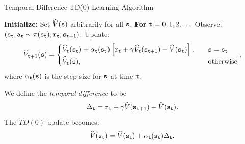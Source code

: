 





\begin{algorithm}[H]
\caption{Temporal Difference TD(0) Learning Algorithm}
\begin{algorithmic}[1]
\State \textbf{Initialize:} Set $\widehat{V}({\tt s})$ arbitrarily for all ${\tt s}$.
\State \textbf{For} {${\tt t} = 0, 1, 2, \dots$}
    \State \quad Observe: $({\tt s}_{\tt t}, {\tt a}_{\tt t} \sim \pi({\tt s}_{\tt t}), {\tt r}_{\tt t}, {\tt s}_{{\tt t}+1})$.
    \State \quad Update:
    \[
    \widehat{V}_{{\tt t}+1}({\tt s}) = \begin{cases}
        \widehat{V}_{\tt t}({\tt s}_{\tt t}) + \alpha_{\tt t}({\tt s}_{\tt t}) \left[{\tt r}_{\tt t} + \gamma \widehat{V}_{\tt t}({\tt s}_{{\tt t}+1}) - \widehat{V}({\tt s}_{\tt t})\right], & \quad {\tt s} = {\tt s}_{\tt t}\\
        \widehat{V}_{\tt t}({\tt s}), & \quad \textrm{otherwise}
    \end{cases},
    \]
    \quad where $\alpha_{\tt t}({\tt s})$ is the step size for ${\tt s}$ at time ${\tt t}$.
\end{algorithmic}
\end{algorithm}
We define the {\em temporal difference} to be
\[
\Delta_{\tt t} ={\tt r}_{\tt t}+\gamma
\widehat{V}({\tt s}_{{\tt t}+1})-\widehat{V}({\tt s}_{\tt t}).
\]
The $TD(0)$ update becomes:
\[
\widehat{V}({\tt s}_{\tt t})=\widehat{V}({\tt s}_{\tt t})+\alpha_{\tt t}({\tt s}_{\tt t})\Delta_{\tt t}.
\]


